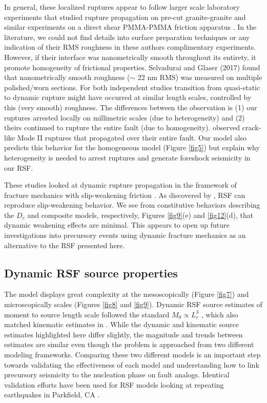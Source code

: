 \documentclass[preprint,1p, 10pt,authoryear]{elsarticle}
\begin{document}
In general, these localized ruptures appear to follow larger scale laboratory experiments that studied rupture propagation on pre-cut granite-granite \citep{Passelegue2013} and similar experiments on a direct shear PMMA-PMMA friction apparatus \citep{Rubinstein2004,Rubinstein2006,Ben-David2010, Fineberg2015,Svetlizky2014}. In the literature, we could not find details into surface preparation techniques or any indication of their RMS roughness in these authors complimentary experiments. However, if their interface was nanometrically smooth throughout its entirety, it promote homogeneity of frictional properties. Selvadurai and Glaser (2017) found that nanometrically smooth roughness ($\sim$ 22 nm RMS) was measured on multiple polished/worn sections. For both independent studies transition from quasi-static to dynamic rupture might have occurred at similar length scales, controlled by this (very smooth) roughness. The differences between the observation is (1) our ruptures arrested locally on millimetric scales (due to heterogeneity) and (2) theirs continued to rupture the entire fault (due to homogeneity). \citet{Svetlizky2014} observed crack-like Mode II ruptures that propagated over their entire fault. Our model also predicts this behavior for the homogeneous model (Figure \ref{fig5}) but explain why heterogeneity is needed to arrest ruptures and generate foreshock seismicity in our RSF.

These studies looked at dynamic rupture propagation in the framework of fracture mechanics with slip-weakening friction \citep{Ida1972,Andrews1976,Kammer2012,Kammer2015}.  As discovered by \citet{Cocco2002}, RSF can reproduce slip-weakening behavior. We see from constitutive behaviors describing the $D_{c}$  and composite models, respectively, Figures \ref{fig9}(e) and \ref{fig12}(d), that dynamic weakening effects are minimal. This appears to open up future investigations into precursory events using dynamic fracture mechanics as an alternative to the RSF presented here.

\subsection{Dynamic RSF source properties}
The model displays great complexity at the mesoscopically (Figure \ref{fig7}) and microscopically scales (Figures \ref{fig8} and \ref{fig9}). Dynamic RSF source estimates of moment to source length scale followed the standard $M_{0} \propto L^{3}_{r}$ , which also matched kinematic estimates in \citet{Selvadurai2019}. While the dynamic and kinematic source estimates highlighted here differ slightly, the magnitude and trends between estimates are similar even though the problem is approached from two different modeling frameworks. Comparing these two different models is an important step towards validating the effectiveness of each model and understanding how to link precursory seismicity to the nucleation phase on fault analogs. Identical validation efforts have been used for RSF models looking at repeating earthquakes in Parkfield, CA \citep{Chen2009}.
\end{document}
